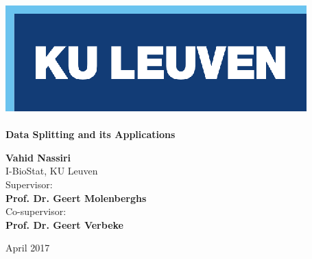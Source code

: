 \documentclass[14pt]{article}
\begin{document}
\begin{titlepage}


\begin{center}
\includegraphics[scale=1]{KUL.eps}\\
\vspace*{.3cm}
{}\\
\vspace*{2cm}
{\Huge{\textbf{Data Splitting and its Applications}}}

\vspace*{4cm}
{\LARGE{\textbf{Vahid Nassiri}}}\\
\vspace*{1cm}
{\Large{I-BioStat, KU Leuven}}\\
\vspace*{2cm}
{\Large{Supervisor:}}\\
\vspace*{0.2cm}
{\LARGE{\textbf{Prof. Dr. Geert Molenberghs}}}\\
\vspace*{0.5cm}
{\Large{Co-supervisor:}}\\
\vspace*{0.2cm}
{\LARGE{\textbf{Prof. Dr. Geert Verbeke}}}
\vspace*{2.3cm}


{\Large{April 2017}}

\end{center}

\end{titlepage}
\newpage
\end{document}
